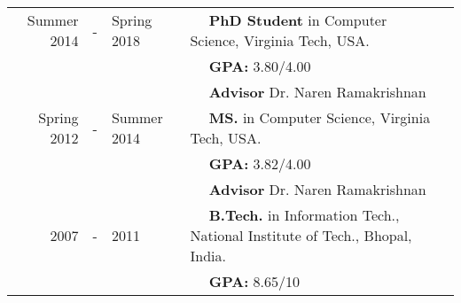 
  \tabcolsep=0.11cm
  \begin{tabular}{rclll}
    Summer 2014 & - & Spring 2018 & $\quad$ {\bf PhD Student} in Computer Science, Virginia Tech, USA. \\
                & & & $\quad$ \textbf{GPA:} 3.80/4.00\\
                & & & $\quad$ \textbf{Advisor} Dr. Naren Ramakrishnan \\
    Spring 2012 & - & Summer 2014 & $\quad$ {\bf MS.} in Computer
    Science, Virginia Tech, USA.\\
                & & & $\quad$ \textbf{GPA:} 3.82/4.00\\
                & & & $\quad$ \textbf{Advisor} Dr. Naren Ramakrishnan \\

    2007 & - & 2011 & $\quad$ {\bf B.Tech.} in Information Tech.,
    National Institute of Tech., Bhopal, India. \\
        & & & $\quad$ \textbf{GPA:} 8.65/10\\
  \end{tabular}

